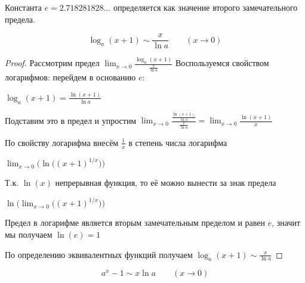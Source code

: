 \begin{definition}
  Константа \(e = 2.718281828 \dotsc\) определяется как значение второго
  замечательного предела.
\end{definition}

\begin{theorem}
  \begin{equation*}
    \log_a (x + 1) \sim \frac{x}{\ln a}
    \qquad
    (x \to 0)
  \end{equation*}
\end{theorem}

\begin{proof} \todo
  Рассмотрим предел $\displaystyle{\lim_{x \to 0}{\frac{\log_a (x + 1)}{\frac{x}{\ln a}}}}$
  Воспользуемся свойством логарифмов: перейдем в основанию $e$:
  
  $\displaystyle{\log_a(x+ 1) = \frac{\ln (x + 1)}{\ln a}}$
  
  Подставим это в предел и упростим $\displaystyle{\lim_{x \to 0}{\frac{\frac{\ln (x + 1)}{\ln a}}{\frac{x}{\ln a}}} = \lim_{x \to 0}{\frac{\ln (x + 1)}{x}}}$
  
  По свойству логарифма внесём $\displaystyle{\frac{1}{x}}$ в степень числа логарифма
  
  $\displaystyle{\lim_{x \to 0}{\bigg(\ln \Big( (x + 1)^{1 / x} \Big) \bigg)}}$
  
  Т.к. $\ln(x)$ непрерывная функция, то её можно вынести за знак предела
  
  $\displaystyle{\ln \bigg( \lim_{x \to 0}{\Big( (x + 1)^{1 / x} \Big) \bigg)}}$
  
  Предел в логарифме является вторым замечательным пределом и
  равен $e$, значит мы получаем $\displaystyle{\ln (e) = 1}$
  
  По определению эквивалентных функций получаем $\displaystyle{\log_a(x+ 1)\sim \frac{x}{\ln a}}$
  
\end{proof}

\begin{theorem}
  \begin{equation*}
    a^x - 1 \sim x \ln a
    \qquad
    (x \to 0)
  \end{equation*}
\end{theorem}

